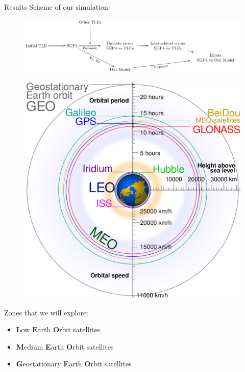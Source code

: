 \documentclass{beamer} %
\begin{document}
\begin{frame}{Results}
  Scheme of our simulation:
  \begin{figure}
    \centering
    \includegraphics[width=\textwidth]{../Images/simulation_scheme.pdf}
  \end{figure}\pause
  \begin{minipage}{0.4\textwidth}
    \begin{figure}[ht]
      \centering
      \includegraphics[width=\textwidth]{../Images/satellite_orbits_custom.pdf}
    \end{figure}
  \end{minipage}\hfill
  \begin{minipage}{0.55\textwidth}
    Zones that we will explore:
    \begin{itemize}
      \item \textbf{L}ow \textbf{E}arth \textbf{O}rbit satellites
      \item \textbf{M}edium \textbf{E}arth \textbf{O}rbit satellites
      \item \textbf{G}eostationary \textbf{E}arth \textbf{O}rbit satellites
    \end{itemize}
  \end{minipage}
\end{frame}
\end{document}
